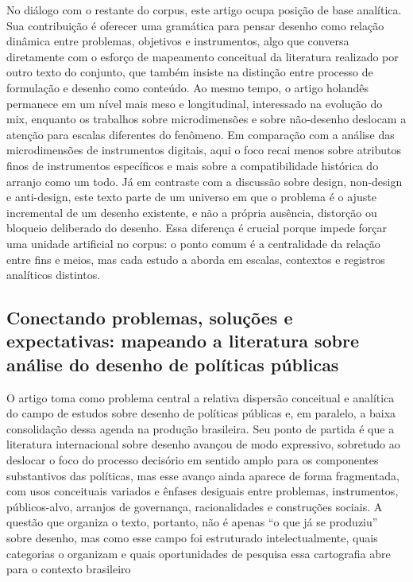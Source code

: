 \documentclass[12pt,a4paper]{article}
\begin{document}
No diálogo com o restante do corpus, este artigo ocupa posição de base analítica. Sua contribuição é oferecer uma gramática para pensar desenho como relação dinâmica entre problemas, objetivos e instrumentos, algo que conversa diretamente com o esforço de mapeamento conceitual da literatura realizado por outro texto do conjunto, que também insiste na distinção entre processo de formulação e desenho como conteúdo. Ao mesmo tempo, o artigo holandês permanece em um nível mais meso e longitudinal, interessado na evolução do mix, enquanto os trabalhos sobre microdimensões e sobre não-desenho deslocam a atenção para escalas diferentes do fenômeno. Em comparação com a análise das microdimensões de instrumentos digitais, aqui o foco recai menos sobre atributos finos de instrumentos específicos e mais sobre a compatibilidade histórica do arranjo como um todo. Já em contraste com a discussão sobre design, non-design e anti-design, este texto parte de um universo em que o problema é o ajuste incremental de um desenho existente, e não a própria ausência, distorção ou bloqueio deliberado do desenho. Essa diferença é crucial porque impede forçar uma unidade artificial no corpus: o ponto comum é a centralidade da relação entre fins e meios, mas cada estudo a aborda em escalas, contextos e registros analíticos distintos. \parencite{geet2019_policy_design,lima2021_conectando_problemas,lui2026_micro_dimensions,newman2020_policy_design}



\subsection{Conectando problemas, soluções e expectativas: mapeando a literatura sobre análise do desenho de políticas públicas}
\label{sec:orgb01d27c}

O artigo toma como problema central a relativa dispersão conceitual e analítica do campo de estudos sobre desenho de políticas públicas e, em paralelo, a baixa consolidação dessa agenda na produção brasileira. Seu ponto de partida é que a literatura internacional sobre desenho avançou de modo expressivo, sobretudo ao deslocar o foco do processo decisório em sentido amplo para os componentes substantivos das políticas, mas esse avanço ainda aparece de forma fragmentada, com usos conceituais variados e ênfases desiguais entre problemas, instrumentos, públicos-alvo, arranjos de governança, racionalidades e construções sociais. A questão que organiza o texto, portanto, não é apenas “o que já se produziu” sobre desenho, mas como esse campo foi estruturado intelectualmente, quais categorias o organizam e quais oportunidades de pesquisa essa cartografia abre para o contexto brasileiro \parencite{lima2021_conectando_problemas}
\end{document}
